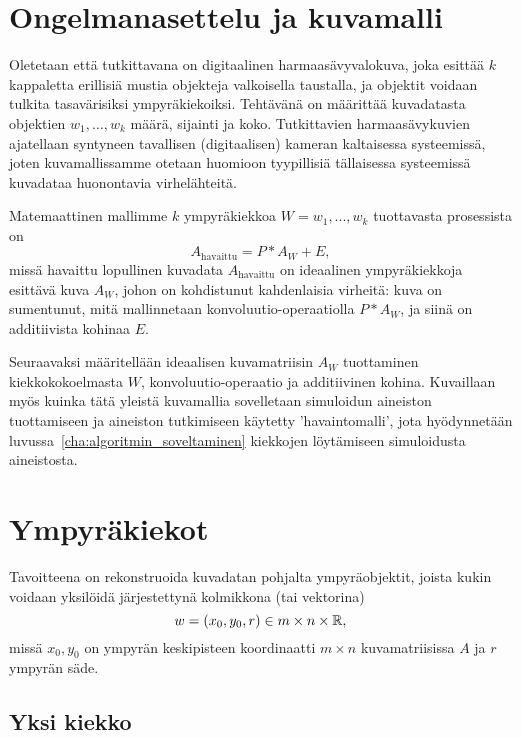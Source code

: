 \section{Ongelmanasettelu ja kuvamalli}
\label{sec:ongelmanasettelu}

Oletetaan että tutkittavana on digitaalinen harmaasävyvalokuva, joka esittää $k$ kappaletta erillisiä mustia objekteja valkoisella taustalla,
ja objektit voidaan tulkita tasavärisiksi ympyräkiekoiksi.
Tehtävänä on määrittää kuvadatasta objektien $w_1, \dots, w_k$ määrä, sijainti ja koko.
Tutkittavien harmaasävykuvien ajatellaan syntyneen tavallisen (digitaalisen) kameran kaltaisessa systeemissä,
joten kuvamallissamme otetaan huomioon tyypillisiä tällaisessa systeemissä kuvadataa huonontavia virhelähteitä.

Matemaattinen mallimme $k$ ympyräkiekkoa $W= {w_1, ..., w_k}$ tuottavasta prosessista on
\begin{equation}
    \label{eq:kuvamalli}
    A_\text{havaittu} = P \ast A_W + E,
\end{equation}
missä havaittu lopullinen kuvadata $A_\text{havaittu}$ on ideaalinen ympyräkiekkoja esittävä kuva $A_W$, johon on kohdistunut kahdenlaisia virheitä:
kuva on sumentunut, mitä mallinnetaan konvoluutio-operaatiolla $P\ast A_W$, ja siinä on additiivista kohinaa $E$.

Seuraavaksi määritellään ideaalisen kuvamatriisin $A_W$ tuottaminen kiekkokokoelmasta $W$, konvoluutio-operaatio ja additiivinen kohina.
Kuvaillaan myös kuinka tätä yleistä kuvamallia sovelletaan simuloidun aineiston tuottamiseen ja aineiston tutkimiseen käytetty 'havaintomalli',
jota hyödynnetään luvussa~\ref{cha:algoritmin_soveltaminen} kiekkojen löytämiseen simuloidusta aineistosta.

\section{Ympyräkiekot}
\label{sec:kiekot}

Tavoitteena on rekonstruoida kuvadatan pohjalta ympyräobjektit, joista kukin voidaan yksilöidä järjestettynä kolmikkona (tai vektorina)
\begin{equation}
    w = (x_0, y_0, r) \in m\times n\times \mathbb{R},
\end{equation}
missä $x_0, y_0$ on ympyrän keskipisteen koordinaatti $m \times n$ kuvamatriisissa $A$ ja $r$ ympyrän säde.

\subsection{Yksi kiekko}
\label{sub:yksi_kiekko}

